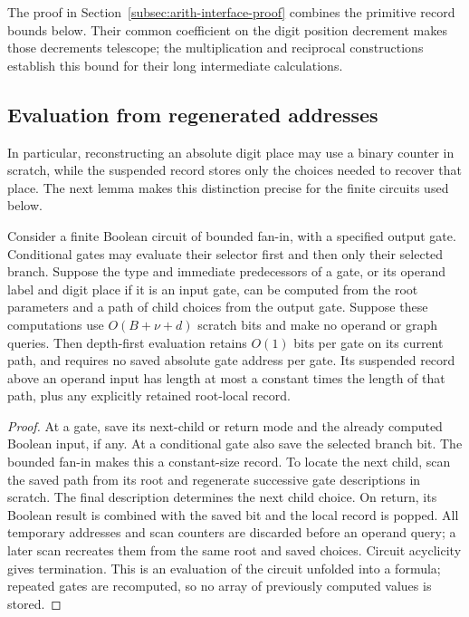 The proof in Section~\ref{subsec:arith-interface-proof} combines the
primitive record bounds below. Their common coefficient on the digit position
decrement makes those decrements telescope; the multiplication and
reciprocal constructions establish this bound for their long intermediate
calculations.

\subsection{Evaluation from regenerated addresses}

In particular, reconstructing an absolute digit place may use a binary
counter in scratch, while the suspended record stores only the choices
needed to recover that place.  The next lemma makes this distinction
precise for the finite circuits used below.

\begin{lemma}
\label{lem:arith-gate-evaluation}
Consider a finite Boolean circuit of bounded fan-in, with a specified
output gate.  Conditional gates may evaluate their selector first and
then only their selected branch.  Suppose the type and immediate predecessors of a gate,
or its operand label and digit place if it is an input gate, can be
computed from the root parameters and a path of child choices from
the output gate.  Suppose these computations use $O(B+\nu+d)$ scratch
bits and make no operand or graph queries.  Then depth-first
evaluation retains $O(1)$ bits per gate on its current path, and
requires no saved absolute gate address per gate.  Its suspended
record above an operand input has length at most a constant times
the length of that path, plus any explicitly retained root-local
record.
\end{lemma}

\begin{proof}
At a gate, save its next-child or return mode and the already computed
Boolean input, if any.  At a conditional gate also save the selected
branch bit.  The bounded fan-in makes this a constant-size
record.  To locate the next child, scan the saved path from its root
and regenerate successive gate descriptions in scratch.  The final
description determines the next child choice.  On return, its Boolean
result is combined with the saved bit and the local record is popped.
All temporary addresses and scan counters are discarded before an
operand query; a later scan recreates them from the same root and
saved choices.  Circuit acyclicity gives termination.  This is an
evaluation of the circuit unfolded into a formula; repeated gates are
recomputed, so no array of previously computed values is stored.
\end{proof}

